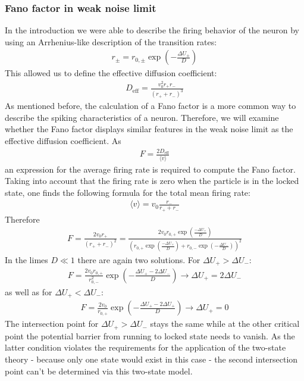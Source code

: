 \documentclass[12pt,a4paper]{article}
\begin{document}
\subsubsection{Fano factor in weak noise limit}
In the introduction we were able to describe the firing behavior of the neuron by using an Arrhenius-like description of the transition rates:
\begin{align*}
r_{\pm}=r_{0,\pm}\exp\left(-\frac{\Delta U_{\pm}}{D}\right)
\end{align*}
This allowed us to define the effective diffusion coefficient:
\begin{align*}
D_{\text{eff}}=\frac{v_0^2 r_+r_-}{(r_++r_-)^3}
\end{align*}
As mentioned before, the calculation of a Fano factor is a more common way to describe the spiking characteristics of a neuron. Therefore, we will examine whether the Fano factor displays similar features in the weak noise limit as the effective diffusion coefficient. As 
\begin{align*}
F=\frac{2D_{\text{eff}}}{\langle v\rangle}
\end{align*}
an expression for the average firing rate is required to compute the Fano factor. Taking into account that the firing rate is zero when the particle is in the locked state, one finds the following formula for the total mean firing rate:
\begin{align*}
\langle v\rangle=v_0\frac{r_-}{r_++r_-}
\end{align*}
Therefore
\begin{align*}
F=\frac{2v_0r_+}{(r_++r_-)^2}=\frac{2v_0r_{0,+}\exp\left(\frac{-\Delta U_+}{D}\right)}{\left(r_{0,+}\exp\left(\frac{-\Delta U_+}{D}\right)+r_{0,-}\exp\left(-\frac{\Delta U_-}{D}\right)\right)^2}
\end{align*}
In the limes $D\ll1$ there are again two solutions. For $\Delta U_+ > \Delta U_-$:
\begin{align*}
F=\frac{2v_0r_{0,+}}{r_{0,-}^2}\exp\left(-\frac{\Delta U_+-2\Delta U_-}{D}\right) \rightarrow \Delta U_+=2\Delta U_-
\end{align*}
as well as for $\Delta U_+ < \Delta U_-$:
\begin{align*}
F=\frac{2v_0}{r_{0,+}}\exp\left(-\frac{\Delta U_+-2\Delta U_+}{D}\right) \rightarrow \Delta U_+=0
\end{align*}
The intersection point for $\Delta U_+ > \Delta U_-$ stays the same while at the other critical point the potential barrier from running to locked state needs to vanish. As the latter condition violates the requirements for the application of the two-state theory - because only one state would exist in this case - the second intersection point can't be determined via this two-state model.
\end{document}
